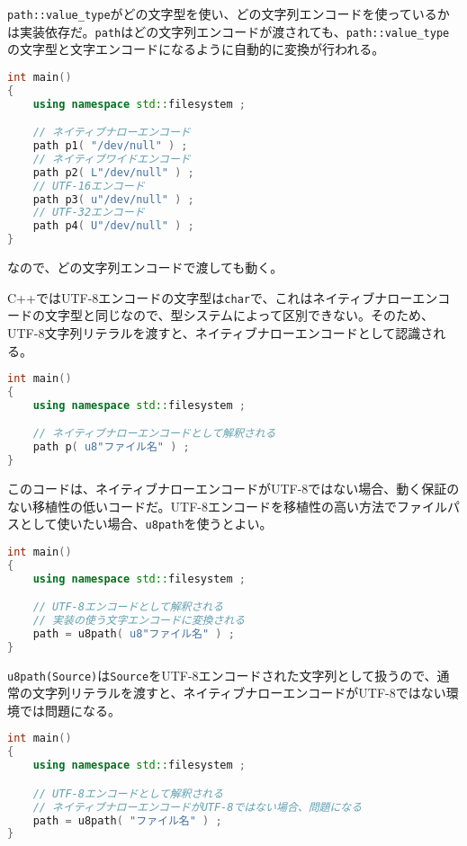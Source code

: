 \lstinline!path::value_type!がどの文字型を使い、どの文字列エンコードを使っているかは実装依存だ。\lstinline!path!はどの文字列エンコードが渡されても、\lstinline!path::value_type!の文字型と文字エンコードになるように自動的に変換が行われる。

\begin{lstlisting}[language=C++]
int main()
{
    using namespace std::filesystem ;

    // ネイティブナローエンコード
    path p1( "/dev/null" ) ;
    // ネイティブワイドエンコード
    path p2( L"/dev/null" ) ;
    // UTF-16エンコード
    path p3( u"/dev/null" ) ;
    // UTF-32エンコード
    path p4( U"/dev/null" ) ;
}
\end{lstlisting}

なので、どの文字列エンコードで渡しても動く。

C++ではUTF-8エンコードの文字型は\lstinline!char!で、これはネイティブナローエンコードの文字型と同じなので、型システムによって区別できない。そのため、UTF-8文字列リテラルを渡すと、ネイティブナローエンコードとして認識される。

\begin{lstlisting}[language=C++]
int main()
{
    using namespace std::filesystem ;

    // ネイティブナローエンコードとして解釈される
    path p( u8"ファイル名" ) ;
}
\end{lstlisting}

このコードは、ネイティブナローエンコードがUTF-8ではない場合、動く保証のない移植性の低いコードだ。UTF-8エンコードを移植性の高い方法でファイルパスとして使いたい場合、\lstinline!u8path!を使うとよい。

\begin{lstlisting}[language=C++]
int main()
{
    using namespace std::filesystem ;

    // UTF-8エンコードとして解釈される
    // 実装の使う文字エンコードに変換される
    path = u8path( u8"ファイル名" ) ;
}
\end{lstlisting}

\lstinline!u8path(Source)!は\lstinline!Source!をUTF-8エンコードされた文字列として扱うので、通常の文字列リテラルを渡すと、ネイティブナローエンコードがUTF-8ではない環境では問題になる。

\begin{lstlisting}[language=C++]
int main()
{
    using namespace std::filesystem ;

    // UTF-8エンコードとして解釈される
    // ネイティブナローエンコードがUTF-8ではない場合、問題になる
    path = u8path( "ファイル名" ) ;
}
\end{lstlisting}

